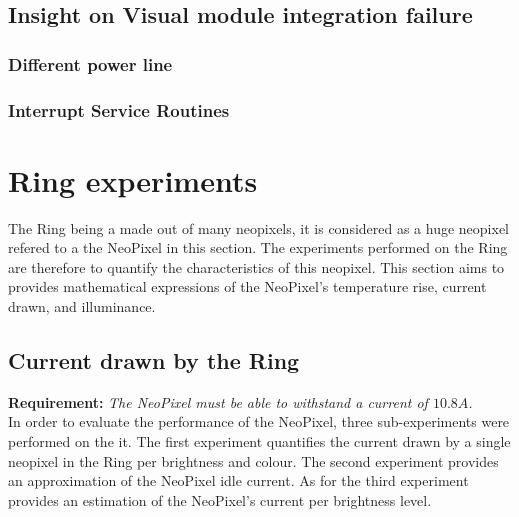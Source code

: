 \subsection{Insight on Visual module integration failure}\label{visual_fail}
\subsubsection{Different power line}
\subsubsection{Interrupt Service Routines}

\section{Ring experiments}
The Ring being a made out of many neopixels, it is considered as a huge neopixel refered to a the NeoPixel in this section. The experiments performed on the Ring are therefore to quantify the characteristics of this neopixel. This section aims to provides mathematical expressions of the NeoPixel's temperature rise, current drawn, and illuminance.

\subsection{Current drawn by the Ring}
\textbf{Requirement:}  \textit{The NeoPixel must be able to withstand a current of $10.8A$.}\\
In order to evaluate the performance of the NeoPixel, three sub-experiments were performed on the it. The first experiment quantifies the current drawn by a single neopixel in the Ring per brightness and colour. The second experiment provides an approximation of the NeoPixel idle current. As for the third experiment provides an estimation of the NeoPixel's current per brightness level.

